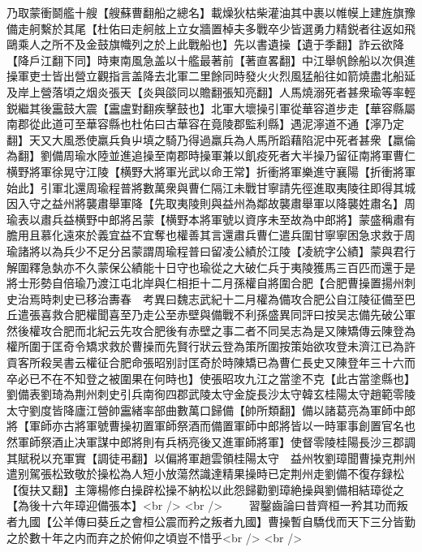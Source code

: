 乃取蒙衝鬬艦十艘【艘蘇曹翻船之總名】載燥狄枯柴灌油其中裹以帷幙上建旌旗豫備走舸繫於其尾【杜佑曰走舸舷上立女牆置棹夫多戰卒少皆選勇力精鋭者往返如飛鷗乘人之所不及金鼓旗幟列之於上此戰船也】先以書遺操【遺于季翻】詐云欲降【降戶江翻下同】時東南風急盖以十艦最著前【著直畧翻】中江舉帆餘船以次俱進操軍吏士皆出營立觀指言盖降去北軍二里餘同時發火火烈風猛船往如箭燒盡北船延及岸上營落頃之烟炎張天【炎與燄同以贍翻張知亮翻】人馬燒溺死者甚衆瑜等率輕鋭繼其後靁鼓大震【靁盧對翻疾擊鼓也】北軍大壞操引軍從華容道步走【華容縣屬南郡從此道可至華容縣也杜佑曰古華容在竟陵郡監利縣】遇泥濘道不通【濘乃定翻】天又大風悉使羸兵負屮填之騎乃得過羸兵為人馬所蹈藉陷泥中死者甚衆【羸倫為翻】劉備周瑜水陸並進追操至南郡時操軍兼以飢疫死者大半操乃留征南將軍曹仁横野將軍徐晃守江陵【横野大將軍光武以命王常】折衝將軍樂進守襄陽【折衝將軍始此】引軍北還周瑜程普將數萬衆與曹仁隔江未戰甘寧請先徑進取夷陵往即得其城因入守之益州將襲肅舉軍降【先取夷陵則與益州為鄰故襲肅舉軍以降襲姓肅名】周瑜表以肅兵益横野中郎將呂蒙【横野本將軍號以資序未至故為中郎將】蒙盛稱肅有膽用且慕化遠來於義宜益不宜奪也權善其言還肅兵曹仁遣兵圍甘寧寧困急求救于周瑜諸將以為兵少不足分呂蒙謂周瑜程普曰留凌公績於江陵【凌統字公績】蒙與君行解圍釋急埶亦不久蒙保公績能十日守也瑜從之大破仁兵于夷陵獲馬三百匹而還于是將士形勢自倍瑜乃渡江屯北岸與仁相拒十二月孫權自將圍合肥【合肥曹操置揚州刺史治焉時刺史已移治夀春　考異曰魏志武紀十二月權為備攻合肥公自江陵征備至巴丘遣張喜救合肥權聞喜至乃走公至赤壁與備戰不利孫盛異同評曰按吴志備先破公軍然後權攻合肥而北紀云先攻合肥後有赤壁之事二者不同吴志為是又陳矯傳云陳登為權所圍于匡奇令矯求救於曹操而先賢行狀云登為策所圍按策始欲攻登未濟江已為許貢客所殺吴書云權征合肥命張昭别討匡奇於時陳矯已為曹仁長史又陳登年三十六而卒必已不在不知登之被圍果在何時也】使張昭攻九江之當塗不克【此古當塗縣也】劉備表劉琦為荆州刺史引兵南徇四郡武陵太守金旋長沙太守韓玄桂陽太守趙範零陵太守劉度皆降廬江營帥靁緒率部曲數萬口歸備【帥所類翻】備以諸葛亮為軍師中郎將【軍師亦古將軍號曹操初置軍師祭酒而備置軍師中郎將皆以一時軍事創置官名也然軍師祭酒止决軍謀中郎將則有兵柄亮後又進軍師將軍】使督零陵桂陽長沙三郡調其賦税以充軍實【調徒弔翻】以偏將軍趙雲領桂陽太守　益州牧劉璋聞曹操克荆州遣别駕張松致敬於操松為人短小放蕩然識達精果操時已定荆州走劉備不復存録松【復扶又翻】主簿楊修白操辟松操不納松以此怨歸勸劉璋絶操與劉備相結璋從之【為後十六年璋迎備張本】<br />
<br />
　　習鑿齒論曰昔齊桓一矜其功而叛者九國【公羊傳曰葵丘之會桓公震而矜之叛者九國】曹操暫自驕伐而天下三分皆勤之於數十年之内而弃之於俯仰之頃豈不惜乎<br />
<br />
